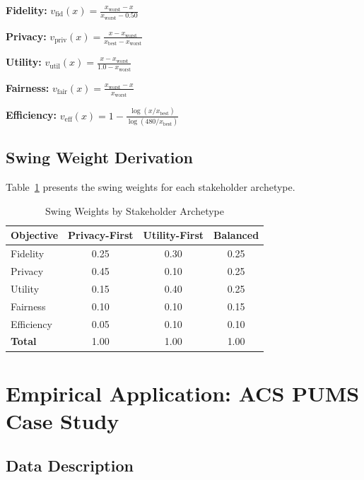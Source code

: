 \documentclass[12pt,a4paper]{article}
\begin{document}
\textbf{Fidelity:} $v_{\text{fid}}(x) = \frac{x_{\text{worst}} - x}{x_{\text{worst}} - 0.50}$

\textbf{Privacy:} $v_{\text{priv}}(x) = \frac{x - x_{\text{worst}}}{x_{\text{best}} - x_{\text{worst}}}$

\textbf{Utility:} $v_{\text{util}}(x) = \frac{x - x_{\text{worst}}}{1.0 - x_{\text{worst}}}$

\textbf{Fairness:} $v_{\text{fair}}(x) = \frac{x_{\text{worst}} - x}{x_{\text{worst}}}$

\textbf{Efficiency:} $v_{\text{eff}}(x) = 1 - \frac{\log(x / x_{\text{best}})}{\log(480 / x_{\text{best}})}$

\subsection{Swing Weight Derivation}

Table~\ref{tab:weights} presents the swing weights for each stakeholder archetype.

\begin{table}[htbp]
\centering
\caption{Swing Weights by Stakeholder Archetype}
\label{tab:weights}
\begin{tabular}{@{}lccc@{}}
\toprule
\textbf{Objective} & \textbf{Privacy-First} & \textbf{Utility-First} & \textbf{Balanced} \\
\midrule
Fidelity & 0.25 & 0.30 & 0.25 \\
Privacy & 0.45 & 0.10 & 0.25 \\
Utility & 0.15 & 0.40 & 0.25 \\
Fairness & 0.10 & 0.10 & 0.15 \\
Efficiency & 0.05 & 0.10 & 0.10 \\
\midrule
\textbf{Total} & 1.00 & 1.00 & 1.00 \\
\bottomrule
\end{tabular}
\end{table}

\section{Empirical Application: ACS PUMS Case Study}

\subsection{Data Description}
\end{document}
